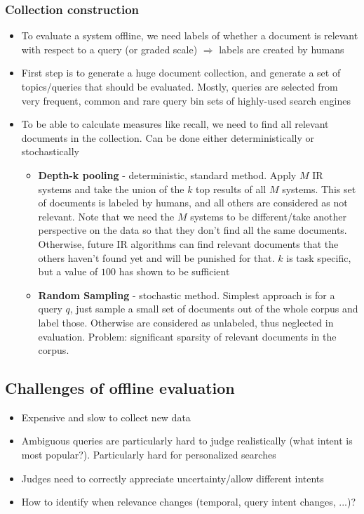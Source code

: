 \subsubsection{Collection construction}
\begin{itemize}
	\item To evaluate a system offline, we need labels of whether a document is relevant with respect to a query (or graded scale) $\Rightarrow$ labels are created by humans
	\item First step is to generate a huge document collection, and generate a set of topics/queries that should be evaluated. Mostly, queries are selected from very frequent, common and rare query bin sets of highly-used search engines 
	\item To be able to calculate measures like recall, we need to find all relevant documents in the collection. Can be done either deterministically or stochastically
	\begin{itemize}
		\item \textbf{Depth-k pooling} - deterministic, standard method. Apply $M$ IR systems and take the union of the $k$ top results of all $M$ systems. This set of documents is labeled by humans, and all others are considered as not relevant. Note that we need the $M$ systems to be different/take another perspective on the data so that they don't find all the same documents. Otherwise, future IR algorithms can find relevant documents that the others haven't found yet and will be punished for that. $k$ is task specific, but a value of $100$ has shown to be sufficient
		\item \textbf{Random Sampling} - stochastic method. Simplest approach is for a query $q$, just sample a small set of documents out of the whole corpus and label those. Otherwise are considered as unlabeled, thus neglected in evaluation. Problem: significant sparsity of relevant documents in the corpus. 
	\end{itemize}
\end{itemize}
\subsection{Challenges of offline evaluation}
\label{sec:offline_eval_problems}
\begin{itemize}
	\item Expensive and slow to collect new data
	\item Ambiguous queries are particularly hard to judge realistically (what intent is most popular?). Particularly hard for personalized searches
	\item Judges need to correctly appreciate uncertainty/allow different intents
	\item How to identify when relevance changes (temporal, query intent changes, ...)?
\end{itemize}
